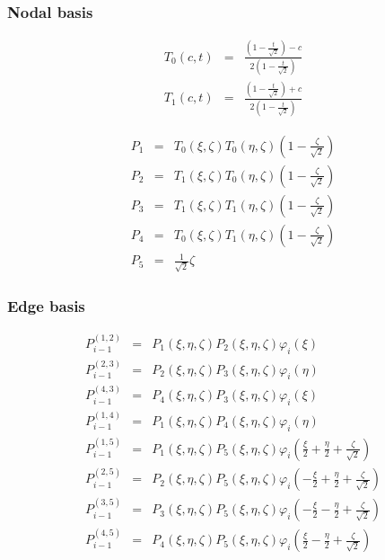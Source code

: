 \subsubsection{Nodal basis}

\begin{eqnarray*}
T_0(c,t)&=&\frac{(1-\frac{t}{\sqrt{2}})-c}{2(1-\frac{t}{\sqrt{2}})} \\
T_1(c,t)&=&\frac{(1-\frac{t}{\sqrt{2}})+c}{2(1-\frac{t}{\sqrt{2}})}
\end{eqnarray*}

\begin{eqnarray*}
P_1&=&T_0(\xi,\zeta)T_0(\eta,\zeta)(1-\frac{\zeta}{\sqrt{2}}) \\
P_2&=&T_1(\xi,\zeta)T_0(\eta,\zeta)(1-\frac{\zeta}{\sqrt{2}}) \\
P_3&=&T_1(\xi,\zeta)T_1(\eta,\zeta)(1-\frac{\zeta}{\sqrt{2}}) \\
P_4&=&T_0(\xi,\zeta)T_1(\eta,\zeta)(1-\frac{\zeta}{\sqrt{2}}) \\
P_5&=&\frac{1}{\sqrt{2}}\zeta 
\end{eqnarray*}

\subsubsection{Edge basis}

\begin{eqnarray*}
P_{i-1}^{(1,2)}&=&P_1(\xi,\eta,\zeta)P_2(\xi,\eta,\zeta)\varphi_i(\xi) \\
P_{i-1}^{(2,3)}&=&P_2(\xi,\eta,\zeta)P_3(\xi,\eta,\zeta)\varphi_i(\eta) \\ 
P_{i-1}^{(4,3)}&=&P_4(\xi,\eta,\zeta)P_3(\xi,\eta,\zeta)\varphi_i(\xi) \\
P_{i-1}^{(1,4)}&=&P_1(\xi,\eta,\zeta)P_4(\xi,\eta,\zeta)\varphi_i(\eta) \\
P_{i-1}^{(1,5)}&=&P_1(\xi,\eta,\zeta)P_5(\xi,\eta,\zeta)
\varphi_i(\frac{\xi}{2}+\frac{\eta}{2}+\frac{\zeta}{\sqrt{2}}) \\
P_{i-1}^{(2,5)}&=&P_2(\xi,\eta,\zeta)P_5(\xi,\eta,\zeta) 
\varphi_i(-\frac{\xi}{2}+\frac{\eta}{2}+\frac{\zeta}{\sqrt{2}}) \\
P_{i-1}^{(3,5)}&=&P_3(\xi,\eta,\zeta)P_5(\xi,\eta,\zeta)
\varphi_i(-\frac{\xi}{2}-\frac{\eta}{2}+\frac{\zeta}{\sqrt{2}}) \\
P_{i-1}^{(4,5)}&=&P_4(\xi,\eta,\zeta)P_5(\xi,\eta,\zeta)
\varphi_i(\frac{\xi}{2}-\frac{\eta}{2}+\frac{\zeta}{\sqrt{2}})
\end{eqnarray*}

